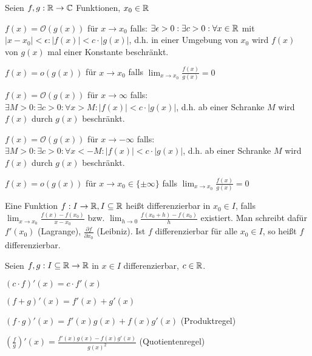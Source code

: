 \begin{definition}
	Seien $f,g : \mathbb{R} \rightarrow \mathbb{C}$ Funktionen, $x_0 \in \mathbb{R}$
	\begin{description}[noitemsep]
		\item $f(x) = \mathcal{O}(g(x))$ für $x \rightarrow x_0$ falls: $\exists \epsilon > 0: \exists c > 0 : \forall x \in \mathbb{R}$ mit $|x - x _0| < \epsilon : |f(x)| < c \cdot |g(x)|$, d.h. in einer Umgebung von $x_0$ wird $f(x)$ von $g(x)$ mal einer Konstante beschränkt.
		\item $f(x) = o(g(x))$ für $x \rightarrow x_0$ falls $\lim_{x \rightarrow x_0} \frac{f(x)}{g(x)} = 0 $
		\item $f(x) = \mathcal{O}(g(x))$ für $x \rightarrow \infty$ falls: $\exists M > 0: \exists c > 0 : \forall x > M : |f(x)| < c \cdot |g(x)|$, d.h. ab einer Schranke $M$ wird $f(x)$ durch $g(x)$ beschränkt.
		\item $f(x) = \mathcal{O}(g(x))$ für $x \rightarrow -\infty$ falls: $\exists M > 0: \exists c > 0 : \forall x < -M : |f(x)| < c \cdot |g(x)|$, d.h. ab einer Schranke $M$ wird $f(x)$ durch $g(x)$ beschränkt.	
		\item $f(x) = o(g(x))$ für $x \rightarrow x_0 \in \{\pm \infty\}$ falls $\lim_{x \rightarrow x_0} \frac{f(x)}{g(x)} = 0 $
	\end{description}
\end{definition}

\begin{definition}[Differenzierbarkeit]
	Eine Funktion $f : I \rightarrow \mathbb{R}, I \subseteq \mathbb{R}$ heißt differenzierbar in $x_0 \in I$, falls $\lim_{x \rightarrow x_0} \frac{f(x) - f(x_0)}{x - x_0}$ bzw. $\lim_{h \rightarrow 0} \frac{f(x_0 + h) - f(x_0)}{h}$ existiert. Man schreibt dafür $f'(x_0)$ (Lagrange), $\frac{\partial f}{\partial x_0}$ (Leibniz). Ist $f$ differenzierbar für alle $x_0 \in I$, so heißt $f$ differenzierbar.
\end{definition}

\begin{satz}
	Seien $f,g : I \subseteq \mathbb{R} \rightarrow \mathbb{R}$ in $x \in I$ differenzierbar, $c \in \mathbb{R}$.
	\begin{description}[noitemsep]
		\item $(c \cdot f)'(x) = c \cdot f'(x) $
		\item $(f + g)'(x) = f'(x) + g'(x) $
		\item $(f \cdot g)'(x) = f'(x) g(x) + f(x)g'(x) $  (Produktregel)
		\item $(\frac{f}{g})'(x) = \frac{f'(x) g(x) - f(x)g'(x)}{g(x)^2} $	 (Quotientenregel)
	\end{description}
\end{satz}


